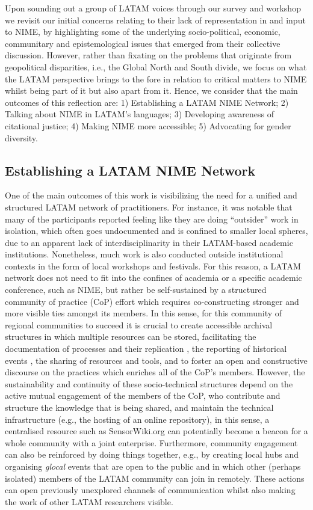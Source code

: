 \documentclass[sigconf]{nimeart}
\begin{document}
Upon sounding out a group of LATAM voices through our survey and workshop we revisit our initial concerns relating to their lack of representation in and input to NIME, by highlighting some of the underlying socio-political, economic, communitary and epistemological issues that emerged from their collective discussion. However, rather than fixating on the problems that originate from geopolitical disparities, i.e., the Global North and South divide, we focus on what the LATAM perspective brings to the fore in relation to critical matters to NIME whilst being part of it but also apart from it. Hence, we consider that the main outcomes of this reflection are: 1) Establishing a LATAM NIME Network; 2) Talking about NIME in LATAM's languages; 3) Developing awareness of citational justice; 4) Making NIME more accessible; 5) Advocating for gender diversity.

\subsection{Establishing a LATAM NIME Network}\label{establishing-a-latam-nime-network}

One of the main outcomes of this work is visibilizing the need for a unified and structured LATAM network of practitioners. For instance, it was notable that many of the participants reported feeling like they are doing ``outsider'' work in isolation, which often goes undocumented and is confined to smaller local spheres, due to an apparent lack of interdisciplinarity in their LATAM-based academic institutions. Nonetheless, much work is also conducted outside institutional contexts in the form of local workshops and festivals. For this reason, a LATAM network does not need to fit into the confines of academia or a specific academic conference, such as NIME, but rather be self-sustained by a structured community of practice (CoP) \cite{lave1991situated} effort which requires co-constructing stronger and more visible ties amongst its members. In this sense, for this community of regional communities to succeed it is crucial to create accessible archival structures in which multiple resources can be stored, facilitating the documentation of processes and their replication \cite{NIME21_4}, the reporting of historical events \cite{NIME21_8}, the sharing of resources and tools, and to foster an open and constructive discourse on the practices which enriches all of the CoP's members. However, the sustainability and continuity of these socio-technical structures depend on the active mutual engagement of the members of the CoP, who contribute and structure the knowledge that is being shared, and maintain the technical infrastructure (e.g., the hosting of an online repository), in this sense, a centralised resource such as SensorWiki.org \cite{Wanderley2006} can potentially become a beacon for a whole community with a joint enterprise. Furthermore, community engagement can also be reinforced by doing things together, e.g., by creating local hubs and organising \emph{glocal} events that are open to the public and in which other (perhaps isolated) members of the LATAM community can join in remotely. These actions can open previously unexplored channels of communication whilst also making the work of other LATAM researchers visible.
\end{document}
